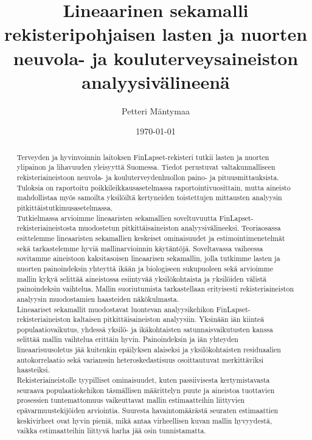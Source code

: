 \documentclass[finnish]{docopts}
\begin{document}
\singlespacing

\title{Lineaarinen sekamalli rekisteripohjaisen lasten ja nuorten neuvola- ja kouluterveysaineiston analyysivälineenä}
\author{Petteri Mäntymaa}
\date{\today}

\maketitle

\begin{abstract}

Terveyden ja hyvinvoinnin laitoksen FinLapset-rekisteri tutkii lasten ja nuorten ylipainon ja lihavuuden yleisyyttä Suomessa. Tiedot perustuvat valtakunnalliseen rekisteriaineistoon neuvola- ja kouluterveydenhuollon paino- ja pituusmittauksista. Tuloksia on raportoitu poikkileikkausasetelmassa raportointivuosittain, mutta aineisto mahdollistaa myös samoilta yksilöiltä kertyneiden toistettujen mittausten analyysin pitkittäistutkimusasetelmassa.\\

Tutkielmassa arvioimme lineaaristen sekamallien soveltuvuutta FinLapset-rekisteriaineistosta muodostetun pitkittäisaineiston analyysivälineeksi. Teoriaosassa esittelemme lineaaristen sekamallien keskeiset ominaisuudet ja estimointimenetelmät sekä tarkastelemme hyviä mallinarvioinnin käytäntöjä. Soveltavassa vaiheessa sovitamme aineistoon kaksitasoisen lineaarisen sekamallin, jolla tutkimme lasten ja nuorten painoindeksin yhteyttä ikään ja biologiseen sukupuoleen sekä arvioimme mallin kykyä selittää aineistossa esiintyvää yksilökohtaista ja yksilöiden välistä painoindeksin vaihtelua. Mallin suoriutumista tarkastellaan erityisesti rekisteriaineiston analyysin muodostamien haasteiden näkökulmasta.\\

Lineaariset sekamallit muodostavat luontevan analyysikehikon FinLapset-rekisteriaineiston kaltaisen pitkittäisaineiston analyysiin. Yksinään iän kiinteä populaatiovaikutus, yhdessä yksilö- ja ikäkohtaisten satunnaisvaikutusten kanssa selittää mallin vaihtelua erittäin hyvin. Painoindeksin ja iän yhteyden lineaarisuusoletus jää kuitenkin epäilyksen alaiseksi ja yksilökohtaisten residuaalien autokorrelaatio sekä varianssin heteroskedastisuus osoittautuvat merkittäviksi haasteiksi.\\

Rekisteriaineistolle tyypilliset ominaisuudet, kuten passiivisesta kertymistavasta seuraava populaatiokehikon täsmällisen määrittelyn puute ja aineistoa tuottavien prosessien tuntemattomuus vaikeuttavat mallin estimaatteihin liittyvien epävarmuustekijöiden arviointia. Suuresta havaintomäärästä seuraten estimaattien keskivirheet ovat hyvin pieniä, mikä antaa virheellisen kuvan mallin hyvyydestä, vaikka estimaatteihin liittyvä harha jää osin tunnistamatta.\\


\end{abstract}
\end{document}
